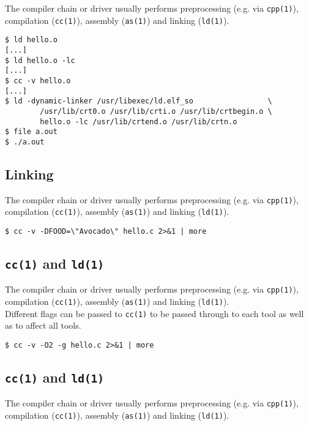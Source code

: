 \documentclass[xga]{xdvislides}
\begin{document}
The compiler chain or driver usually performs
preprocessing (e.g. via {\tt cpp(1)}), compilation
({\tt cc(1)}), assembly ({\tt as(1)}) and linking
({\tt ld(1)}).

\begin{verbatim}
$ ld hello.o
[...]
$ ld hello.o -lc
[...]
$ cc -v hello.o
[...]
$ ld -dynamic-linker /usr/libexec/ld.elf_so                 \
        /usr/lib/crt0.o /usr/lib/crti.o /usr/lib/crtbegin.o \
        hello.o -lc /usr/lib/crtend.o /usr/lib/crtn.o
$ file a.out
$ ./a.out
\end{verbatim}

\subsection{Linking}

The compiler chain or driver usually performs
preprocessing (e.g. via {\tt cpp(1)}), compilation
({\tt cc(1)}), assembly ({\tt as(1)}) and linking
({\tt ld(1)}).

\begin{verbatim}
$ cc -v -DFOOD=\"Avocado\" hello.c 2>&1 | more
\end{verbatim}


\subsection{{\tt cc(1)} and {\tt ld(1)}}

The compiler chain or driver usually performs
preprocessing (e.g. via {\tt cpp(1)}), compilation
({\tt cc(1)}), assembly ({\tt as(1)}) and linking
({\tt ld(1)}).
\\

Different flags can be passed to {\tt cc(1)} to be passed through to each tool
as well as to affect all tools.  \\

\begin{verbatim}
$ cc -v -O2 -g hello.c 2>&1 | more
\end{verbatim}

\subsection{{\tt cc(1)} and {\tt ld(1)}}

The compiler chain or driver usually performs
preprocessing (e.g. via {\tt cpp(1)}), compilation
({\tt cc(1)}), assembly ({\tt as(1)}) and linking
({\tt ld(1)}).
\\
\end{document}
